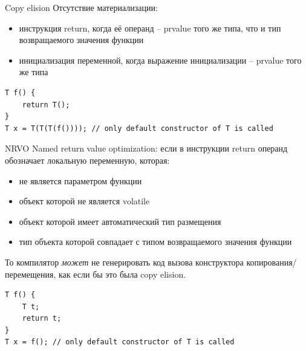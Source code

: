 \documentclass[unknownkeysallowed,xcolor=table]{beamer}
\begin{document}
\begin{frame}[fragile]{Copy elision}
Отсутствие материализации: \vspace{1em}
\begin{itemize}
  \item инструкция return, когда её операнд -- prvalue того же типа, что и тип возвращаемого значения функции \vspace{1em}
  \item инициализация переменной, когда выражение инициализации -- prvalue того же типа
\end{itemize}

\vspace{1em}
\begin{lstlisting}
T f() {
    return T();
}
T x = T(T(T(f()))); // only default constructor of T is called
\end{lstlisting}
\end{frame}

\begin{frame}[fragile]{NRVO}
Named return value optimization: если в инструкции return операнд обозначает локальную переменную, которая:
\begin{itemize}
  \item не является параметром функции
  \item объект которой не является volatile
  \item объект которой имеет автоматический тип размещения
  \item тип объекта которой совпадает с типом возвращаемого значения функции
\end{itemize}
То компилятор \emph{может} не генерировать код вызова конструктора копирования/перемещения, как если бы это была copy elision.

\begin{lstlisting}
T f() {
    T t;
    return t;
}
T x = f(); // only default constructor of T is called
\end{lstlisting}
\end{frame}
\end{document}

